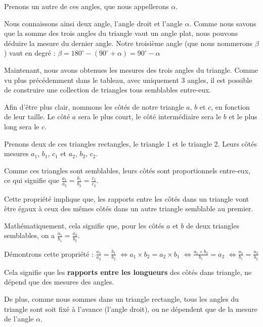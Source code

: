 \documentclass[a4paper]{article}
\begin{document}
			Prenons un autre de ces angles, que nous appellerons $\alpha$. 
			
			Nous connaissons ainsi deux angle, l'angle droit et l'angle $\alpha$.
			Comme nous savons que la somme des trois angles du triangle vaut un angle plat,
			nous pouvons déduire la mesure du dernier angle.
			Notre troisième angle (que nous nommerons $\beta$) vaut en degré : $\beta = 180^\circ - (90^\circ + \alpha) = 90^\circ - \alpha$

			\medbreak

			Maintenant, nous avons obtenues les mesures des trois angles du triangle.
			Comme vu plus précédemment dans le tableau,
			avec uniquement 3 angles, il est possible de construire une collection de triangles tous semblables entre-eux.

			Afin d'être plus clair, nommons les côtés de notre triangle $a$, $b$ et $c$, en fonction de leur taille.
			Le côté $a$ sera le plus court, le côté intermédiaire sera le $b$ et le plus long sera le $c$.

			Prenons deux de ces triangles rectangles, le triangle 1 et le triangle 2. 
			Leurs côtés mesures $a_1$, $b_1$, $c_1$ et $a_2$, $b_2$, $c_2$.

			\medbreak

			Comme ces triangles sont semblables, 
			leurs côtés sont proportionnels entre-eux,
			ce qui signifie que $\frac{a_1}{a_2} = \frac{b_1}{b_2} = \frac{c_1}{c_2}$.

			Cette propriété implique que, les rapports entre les côtés dans un triangle 
			vont être égaux à ceux des mêmes côtés dans un autre triangle semblable au premier.

			Mathématiquement, cela signifie que, 
			pour les côtés $a$ et $b$ de deux triangles semblables, 
			on a $\frac{a_1}{b_1} = \frac{a_2}{b_2}$.

			Démontrons cette propriété :
			$\frac{a_1}{a_2} = \frac{b_1}{b_2}$
			$\Longleftrightarrow a_1 \times b_2 = a_2 \times b_1$
			$\Longleftrightarrow \frac{a_1 \times b_2}{b_1} = a_2$
			$\Longleftrightarrow \frac{a_1}{b_1} = \frac{a_2}{b_2}$

			\medbreak

			Cela signifie que les \textbf{rapports entre les longueurs} des côtés dans triangle, ne dépend que des mesures des angles.

			De plus, comme nous sommes dans un triangle rectangle,
			tous les angles du triangle sont soit fixé à l'avance (l'angle droit), 
			ou ne dépendent que de la mesure de l'angle $\alpha$. 
\end{document}
